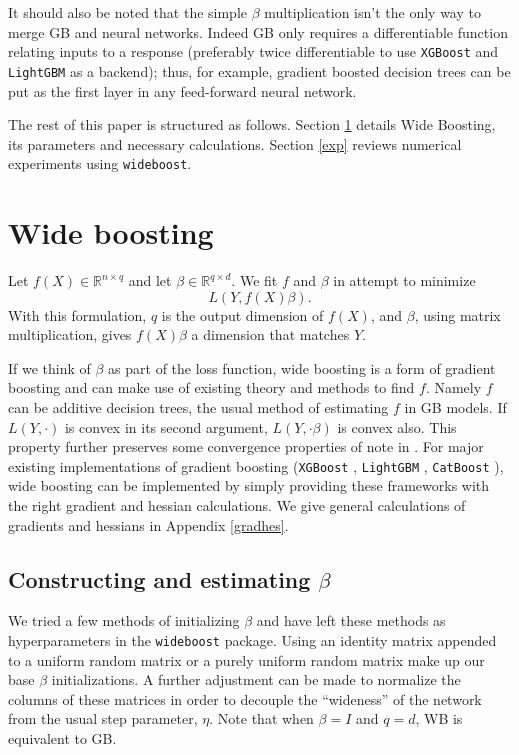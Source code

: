 \documentclass{article}
\begin{document}
It should also be noted that the simple $\beta$ multiplication isn't the only way to merge GB and neural networks. Indeed GB only requires a differentiable function relating inputs to a response (preferably twice differentiable to use \texttt{XGBoost} and \texttt{LightGBM} as a backend); thus, for example, gradient boosted decision trees can be put as the first layer in any feed-forward neural network.

The rest of this paper is structured as follows. Section \ref{wbreview} details Wide Boosting, its parameters and necessary calculations. Section \ref{exp} reviews numerical experiments using \texttt{wideboost}.

\section{Wide boosting}
\label{wbreview}

Let $f(X) \in \mathbb{R}^{n \times q}$ and let $\beta \in \mathbb{R}^{q \times d}$. We fit $f$ and $\beta$ in attempt to minimize
\begin{equation}
L(Y,f(X) \beta). \label{wb}
\end{equation}
With this formulation, $q$ is the output dimension of $f(X)$, and $\beta$, using matrix multiplication, gives $f(X)\beta$ a dimension that matches $Y$. 

If we think of $\beta$ as part of the loss function, wide boosting is a form of gradient boosting and can make use of existing theory and methods to find $f$. Namely $f$ can be additive decision trees, the usual method of estimating $f$ in GB models.  If $L(Y,\cdot)$ is convex in its second argument, $L(Y,\cdot \beta)$ is convex also. This property further preserves some convergence properties of note in \cite{grubb2011generalized}. For major existing implementations of gradient boosting (\texttt{XGBoost} \citep{xgboost}, \texttt{LightGBM} \citep{lightgbm}, \texttt{CatBoost} \citep{catboost}), wide boosting can be implemented by simply providing these frameworks with the right gradient and hessian calculations. We give general calculations of gradients and hessians in Appendix \ref{gradhes}.

\subsection{Constructing and estimating $\beta$}
\label{constb}

We tried a few methods of initializing $\beta$ and have left these methods as hyperparameters in the \texttt{wideboost} package. Using an identity matrix appended to a uniform random matrix or a purely uniform random matrix make up our base $\beta$ initializations. A further adjustment can be made to normalize the columns of these matrices in order to decouple the ``wideness'' of the network from the usual step parameter, $\eta$. Note that when $\beta = I$ and $q=d$, WB is equivalent to GB.
\end{document}
